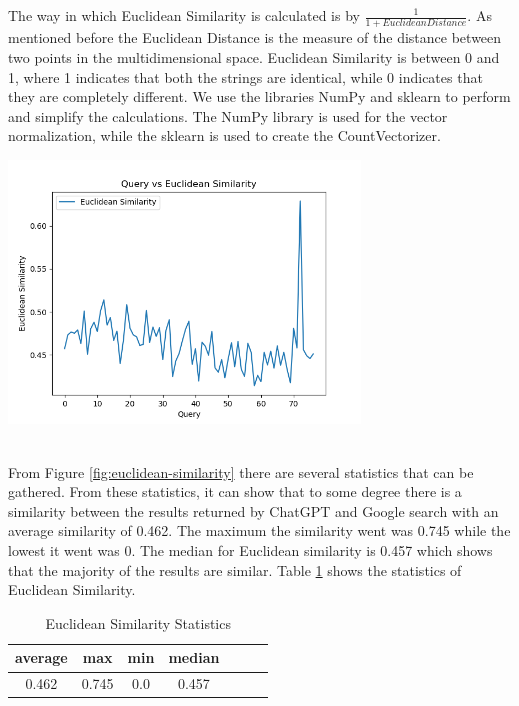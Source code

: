 \documentclass[50pt]{usiinfbachelorproject}
\begin{document}
The way in which Euclidean Similarity is calculated is by $ \frac{1}{1 + Euclidean Distance}$. As mentioned before the Euclidean Distance is the measure of the distance between two points in the multidimensional space. Euclidean Similarity is between 0 and 1, where 1 indicates that both the strings are identical, while 0 indicates that they are completely different. We use the libraries NumPy and sklearn to perform and simplify the calculations. The NumPy library is used for the vector normalization, while the sklearn is used to create the CountVectorizer. 

\noindent
  \begin{minipage}{\linewidth}
  \centering
  \includegraphics[width=0.7\textwidth]{images/euclidean-similarity.png}
  \label{fig:euclidean-similarity}
  \end{minipage}
  \\
  From Figure \ref{fig:euclidean-similarity} there are several statistics that can be gathered. From these statistics, it can show that to some degree there is a similarity between the results returned by ChatGPT and Google search with an average similarity of 0.462. The maximum the similarity went was 0.745 while the lowest it went was 0. The median for Euclidean similarity is 0.457 which shows that the majority of the results are similar. Table \ref{tab:euclidean_similarity_statistics} shows the statistics of Euclidean Similarity.

\begin{table}[H]
    \centering
    \begin{tabular}{|c|c|c|c|c|c|c|}
      \hline
      average & max & min & median \\
      \hline
      \hline
      0.462 & 0.745 & 0.0 & 0.457 \\
      \hline
    \end{tabular}
    \caption{Euclidean Similarity Statistics}
    \label{tab:euclidean_similarity_statistics}
\end{table}
\end{document}

